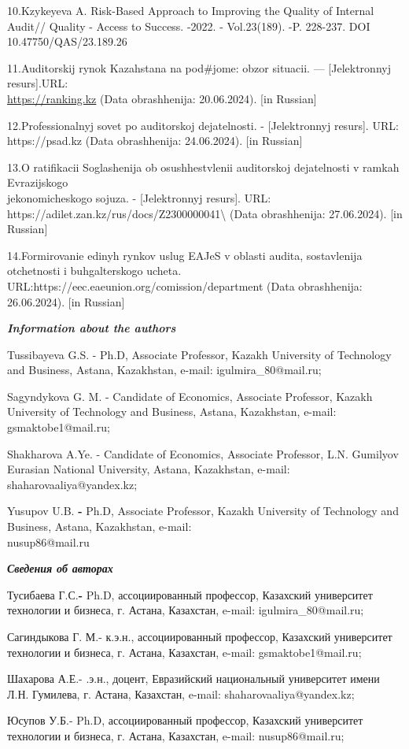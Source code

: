 \begin{references}
10.Kzykeyeva A. Risk-Based Approach to Improving the Quality of Internal
Audit// Quality - Access to Success. -2022. - Vol.23(189). -P. 228-237.
DOI 10.47750/QAS/23.189.26

11.Auditorskij rynok Kazahstana na pod\#jome: obzor situacii. ---
{[}Jelektronnyj resurs{]}.URL:
\\\href{https://ranking.kz/reviews/banking-and-finance/auditorskiy-rynok-kazahstana-na-podyome-obzor-situatsii.html}{https://ranking.kz}
(Data obrashhenija: 20.06.2024). {[}in Russian{]}

12.Professional\textquotesingle nyj sovet po auditorskoj
dejatel\textquotesingle nosti. - {[}Jelektronnyj resurs{]}. URL:
https://psad.kz (Data obrashhenija: 24.06.2024). {[}in Russian{]}

13.O ratifikacii Soglashenija ob osushhestvlenii auditorskoj
dejatel\textquotesingle nosti v ramkah Evrazijskogo \\jekonomicheskogo
sojuza. - {[}Jelektronnyj resurs{]}. URL:
https://adilet.zan.kz/rus/docs/Z2300000041\textbackslash{} (Data
obrashhenija: 27.06.2024). {[}in Russian{]}

14.Formirovanie edinyh rynkov uslug EAJeS v oblasti audita, sostavlenija
otchetnosti i buhgalterskogo ucheta.
URL:https://eec.eaeunion.org/comission/department (Data obrashhenija:
26.06.2024). {[}in Russian{]}
\end{references}

\begin{authorinfo}
\hspace{1em}\emph{\textbf{Information about the authors}}

Tussibayeva G.S. - Ph.D, Associate Professor, Kazakh University of
Technology and Business, Astana, Kazakhstan, e-mail:
igulmira\_80@mail.ru;

Sagyndykova G. M. - Candidate of Economics, Associate Professor, Kazakh
University of Technology and Business, Astana, Kazakhstan, e-mail:
gsmaktobe1@mail.ru;

Shakharova A.Ye. - Candidate of Economics, Associate Professor, L.N.
Gumilyov Eurasian National University, Astana, Kazakhstan, e-mail:
shaharovaaliya@yandex.kz;

Yusupov U.B. \textbf{-} Ph.D, Associate Professor, Kazakh University of
Technology and Business, Astana, Kazakhstan, e-mail: \\nusup86@mail.ru

\hspace{1em}\emph{\textbf{Сведения об авторах}}

Тусибаева Г.С.\textbf{-} Ph.D, ассоциированный профессор, Казахский
университет технологии и бизнеса, г. Астана, Казахстан, e-mail:
igulmira\_80@mail.ru;

Сагиндыкова Г. М.- к.э.н., ассоциированный профессор, Казахский
университет технологии и бизнеса, г. Астана, Казахстан, e-mail:
gsmaktobe1@mail.ru;

Шахарова А.Е.- .э.н., доцент, Евразийский национальный университет имени
Л.Н. Гумилева, г. Астана, Казахстан, e-mail: shaharovaaliya@yandex.kz;

Юсупов У.Б.- Ph.D, ассоциированный профессор, Казахский университет
технологии и бизнеса, г. Астана, Казахстан, e-mail: nusup86@mail.ru;
\end{authorinfo}
